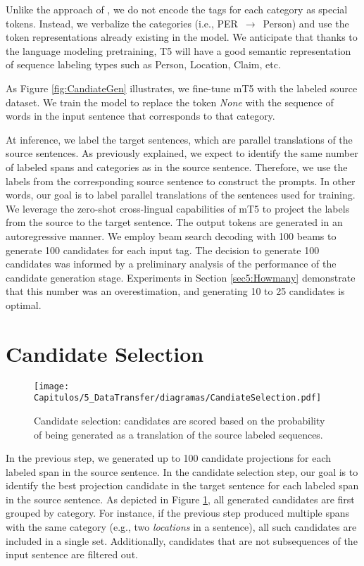Unlike the approach of \citet{huang-etal-2022-multilingual-generative}, we do not encode the tags for each category as special tokens. Instead, we verbalize the categories (i.e., PER $\,\to\,$ Person) and use the token representations already existing in the model. We anticipate that thanks to the language modeling pretraining, T5 will have a good semantic representation of sequence labeling types such as Person, Location, Claim, etc.

As Figure \ref{fig:CandiateGen} illustrates, we fine-tune mT5 with the labeled source dataset. We train the model to replace the token \emph{None} with the sequence of words in the input sentence that corresponds to that category.

At inference, we label the target sentences, which are parallel translations of the source sentences. As previously explained, we expect to identify the same number of labeled spans and categories as in the source sentence. Therefore, we use the labels from the corresponding source sentence to construct the prompts. In other words, our goal is to label parallel translations of the sentences used for training. We leverage the zero-shot cross-lingual capabilities of mT5 to project the labels from the source to the target sentence. The output tokens are generated in an autoregressive manner. We employ beam search decoding with 100 beams to generate 100 candidates for each input tag. The decision to generate 100 candidates was informed by a preliminary analysis of the performance of the candidate generation stage. Experiments in Section \ref{sec5:Howmany} demonstrate that this number was an overestimation, and generating 10 to 25 candidates is optimal.

\section{Candidate Selection}\label{sec5:candidate-selection}

\begin{figure}[t]
\centering
\texttt{[image: Capitulos/5\_DataTransfer/diagramas/CandiateSelection.pdf]}
\caption{Candidate selection: candidates are scored based on the probability of being generated as a translation of the source labeled sequences.}
\label{fig:CandiateSelection}
\end{figure}

In the previous step, we generated up to 100 candidate projections for each labeled span in the source sentence. In the candidate selection step, our goal is to identify the best projection candidate in the target sentence for each labeled span in the source sentence. As depicted in Figure \ref{fig:CandiateSelection}, all generated candidates are first grouped by category. For instance, if the previous step produced multiple spans with the same category (e.g., two \textit{locations} in a sentence), all such candidates are included in a single set. Additionally, candidates that are not subsequences of the input sentence are filtered out.

